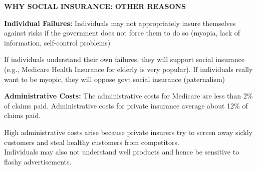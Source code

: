 \documentclass[landscape]{slides}
\begin{document}
\begin{slide}
\begin{center}
{\bf WHY SOCIAL INSURANCE: OTHER REASONS}
\end{center}


{\bf Individual Failures:} Individuals may not appropriately insure themselves against risks if the government does not force them to do so (myopia, lack of information, self-control problems)

\small
If individuals understand their own failures, they will support social insurance (e.g., Medicare Health Insurance for elderly is very popular).
If individuals really want to be myopic, they will oppose govt social insurance (paternalism)
\normalsize

{\bf Administrative Costs: }
The administrative costs for Medicare are less than 2\% of claims paid.
Administrative costs for private insurance average about 12\% of claims paid.

\small
High administrative costs arise because private insurers try to screen away sickly customers
and steal healthy customers from competitors. \\ 
Individuals may also not understand well products
and hence be sensitive to flashy advertisements. 
\normalsize

\end{slide}


%



%
%
%
%
%
%
\end{document}
